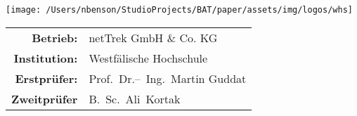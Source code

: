 \begin{titlepage}
    \maketitle
    \vspace*{\fill}
    \begin{flushleft}
        
    \end{flushleft}
    \vspace{1cm}
    \begin{flushright}
        \texttt{[image: /Users/nbenson/StudioProjects/BAT/paper/assets/img/logos/whs]}
    \end{flushright}
    \vspace*{\fill}
    \begin{large}
        \begin{tabular}{r l}
            \textbf{Betrieb:}     & netTrek GmbH \& Co. KG         \\
            \textbf{Institution:} & Westfälische Hochschule        \\
            \textbf{Erstprüfer:}  & Prof.~Dr.--~Ing.~Martin Guddat \\
            \textbf{Zweitprüfer}  & B.~Sc.~Ali~Kortak              \\
        \end{tabular}
    \end{large}
\end{titlepage}